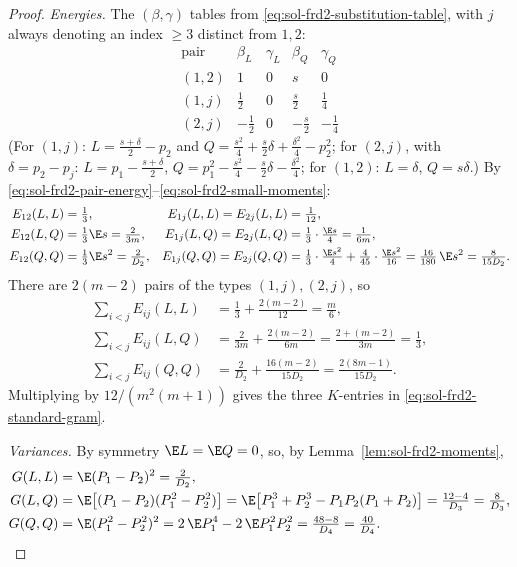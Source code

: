 \documentclass[../main.tex]{subfiles}
\begin{document}
\begin{proof}
\emph{Energies.}  The $(\beta,\gamma)$ tables from
\eqref{eq:sol-frd2-substitution-table}, with $j$ always denoting an index
$\ge3$ distinct from $1,2$:
\[
\begin{array}{l|cc|cc}
 \text{pair} & \beta_L & \gamma_L & \beta_Q & \gamma_Q\\\hline
 (1,2) & 1 & 0 & s & 0\\
 (1,j) & \tfrac12 & 0 & \tfrac s2 & \tfrac14\\
 (2,j) & -\tfrac12 & 0 & -\tfrac s2 & -\tfrac14
\end{array}
\]
(For $(1,j)$: $L=\tfrac{s+\delta}2-p_2$ and
$Q=\tfrac{s^2}4+\tfrac s2\delta+\tfrac{\delta^2}4-p_2^2$; for $(2,j)$, with
$\delta=p_2-p_j$: $L=p_1-\tfrac{s+\delta}2$,
$Q=p_1^2-\tfrac{s^2}4-\tfrac s2\delta-\tfrac{\delta^2}4$; for $(1,2)$:
$L=\delta$, $Q=s\delta$.)  By
\eqref{eq:sol-frd2-pair-energy}--\eqref{eq:sol-frd2-small-moments}:
\begin{align*}
  E_{12}(L,L)&=\tfrac13, &
  E_{1j}(L,L)=E_{2j}(L,L)&=\tfrac1{12},\\
  E_{12}(L,Q)&=\tfrac13\E s=\tfrac2{3m}, &
  E_{1j}(L,Q)=E_{2j}(L,Q)&=\tfrac13\cdot\tfrac{\E s}4=\tfrac1{6m},\\
  E_{12}(Q,Q)&=\tfrac13\E s^2=\tfrac2{D_2}, &
  E_{1j}(Q,Q)=E_{2j}(Q,Q)
  &=\tfrac13\cdot\tfrac{\E s^2}4+\tfrac4{45}\cdot\tfrac{\E s^2}{16}
   =\tfrac{16}{180}\,\E s^2=\tfrac8{15D_2}.
\end{align*}
There are $2(m-2)$ pairs of the types $(1,j),(2,j)$, so
\begin{align*}
  \sum_{i<j}E_{ij}(L,L)&=\tfrac13+\tfrac{2(m-2)}{12}=\tfrac m6,\\
  \sum_{i<j}E_{ij}(L,Q)&=\tfrac2{3m}+\tfrac{2(m-2)}{6m}=\tfrac{2+(m-2)}{3m}
   =\tfrac13,\\
  \sum_{i<j}E_{ij}(Q,Q)&=\tfrac2{D_2}+\tfrac{16(m-2)}{15D_2}
   =\tfrac{2(8m-1)}{15D_2}.
\end{align*}
Multiplying by $12/(m^2(m+1))$ gives the three $K$-entries in
\eqref{eq:sol-frd2-standard-gram}.

\emph{Variances.}  By symmetry $\E L=\E Q=0$, so, by
Lemma~\ref{lem:sol-frd2-moments},
\begin{align*}
  G(L,L)&=\E(P_1-P_2)^2=\tfrac2{D_2},\\
  G(L,Q)&=\E\bigl[(P_1-P_2)(P_1^2-P_2^2)\bigr]
   =\E\bigl[P_1^3+P_2^3-P_1P_2(P_1+P_2)\bigr]
   =\tfrac{12-4}{D_3}=\tfrac8{D_3},\\
  G(Q,Q)&=\E(P_1^2-P_2^2)^2
   =2\,\E P_1^4-2\,\E P_1^2P_2^2=\tfrac{48-8}{D_4}=\tfrac{40}{D_4}.
  \qedhere
\end{align*}
\end{proof}
\end{document}
